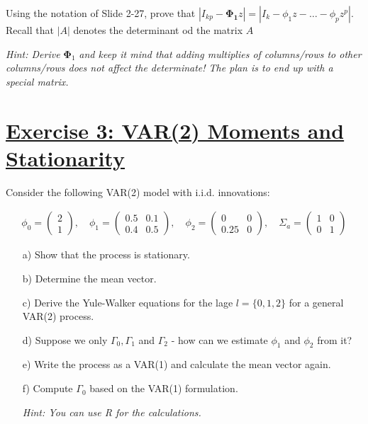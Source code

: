 \documentclass[12pt,a4paper]{article}
\newcommand{\tmpsection}[1]{}
\let\tmpsection=\section
\renewcommand{\section}[1]{\tmpsection{\underline{#1}} }
\begin{document}
Using the notation of Slide 2-27, prove that
\(|I_{kp} - \pmb{\Phi_1} z| = |I_k - \phi_1 z - \ldots - \phi_p z^p|\).
Recall that \(|A|\) denotes the determinant od the matrix \(A\)

\emph{Hint: Derive} \(\pmb{\Phi}_1\) \emph{and keep it mind that adding
multiplies of columns/rows to other columns/rows does not affect the
determinate! The plan is to end up with a special matrix.}

\hypertarget{exercise-3-var2-moments-and-stationarity}{%
\section{Exercise 3: VAR(2) Moments and
Stationarity}\label{exercise-3-var2-moments-and-stationarity}}

Consider the following VAR(2) model with i.i.d. innovations:

\begin{align*}
    \phi_0 = \begin{pmatrix} 2 \\ 1 \end{pmatrix}, \quad \phi_1 = \begin{pmatrix} 0.5 & 0.1 \\ 0.4 & 0.5 \end{pmatrix}, \quad \phi_2 = \begin{pmatrix} 0 & 0 \\ 0.25 & 0 \end{pmatrix}, \quad \Sigma_a = \begin{pmatrix} 1 & 0 \\ 0 & 1 \end{pmatrix}
\end{align*}

\begin{itemize}
    \item[a)] Show that the process is stationary.
    \item[b)] Determine the mean vector.
    \item[c)] Derive the Yule-Walker equations for the lage $l = \{0,1,2 \}$ for a general VAR(2) process.
    \item[d)] Suppose we only $\Gamma_0 , \Gamma_1$ and $\Gamma_2$ - how can we estimate $\phi_1$ and $\phi_2$ from it?
    \item[e)] Write the process as a VAR(1) and calculate the mean vector again.
    \item[f)] Compute $\Gamma_0$ based on the VAR(1) formulation.
    \item[] \textit{Hint: You can use R for the calculations.}

\end{itemize}
\end{document}
